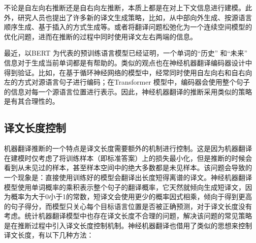 \parinterval 不论是自左向右推断还是自右向左推断，本质上都是在对上下文信息进行建模。此外，研究人员也提出了许多新的译文生成策略，比如，从中部向外生成、按源语言顺序生成、基于插入的方式生成等。或者将翻译问题松弛化为一个连续空间模型的优化问题，进而在推断的过程中同时使用译文左右两端的信息。

\parinterval 最近，以BERT 为代表的预训练语言模型已经证明，一个单词的“历史” 和“未来” 信息对于生成当前单词都是有帮助的。类似的观点也在神经机器翻译编码器设计中得到验证。比如，在基于循环神经网络的模型中，经常同时使用自左向右和自右向左的方式对源语言句子进行编码；在Transformer 模型中，编码器会使用整个句子的信息对每一个源语言位置进行表示。因此，神经机器翻译的推断采用类似的策略是有其合理性的。


\subsection{译文长度控制}

\parinterval 机器翻译推断的一个特点是译文长度需要额外的机制进行控制。这是因为机器翻译在建模时仅考虑了将训练样本（即标准答案）上的损失最小化，但是推断的时候会看到从未见过的样本，甚至样本空间中的绝大多数都是未见样本。该问题会导致的一个现象是：直接使用训练好的模型会翻译出长度短得离谱的译文。神经机器翻译模型使用单词概率的乘积表示整个句子的翻译概率，它天然就倾向生成短译文，因为概率为大于0小于1的常数，短译文会使用更少的概率因式相乘，倾向于得到更高的句子得分，而模型只关心每个目标语言位置是否被正确预测，对于译文长度没有考虑。统计机器翻译模型中也存在译文长度不合理的问题，解决该问题的常见策略是在推断过程中引入译文长度控制机制。神经机器翻译也借用了类似的思想来控制译文长度，有以下几种方法：

